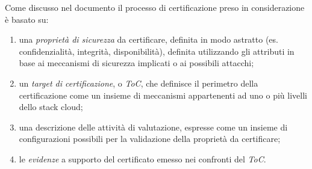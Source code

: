 \documentclass[../main.tex]{subfiles}
\begin{document}
Come discusso nel documento \cite{TrustModelCloudAnisDamArd} il processo di certificazione preso in considerazione è basato su:
\begin{enumerate}
\item una \textit{proprietà di sicurezza} da certificare, definita in modo astratto (es. confidenzialità, integrità, disponibilità), definita utilizzando gli attributi in base ai meccanismi di sicurezza implicati o ai possibili attacchi;
\item un \textit{target di certificazione}, o \textit{ToC}, che definisce il perimetro della certificazione come un insieme di meccanismi appartenenti ad uno o più livelli dello stack cloud;
\item una descrizione delle attività di valutazione, espresse come un insieme di configurazioni possibili per la validazione della proprietà da certificare;
\item le \textit{evidenze} a supporto del certificato emesso nei confronti del \textit{ToC}.
\end{enumerate}
\end{document}
